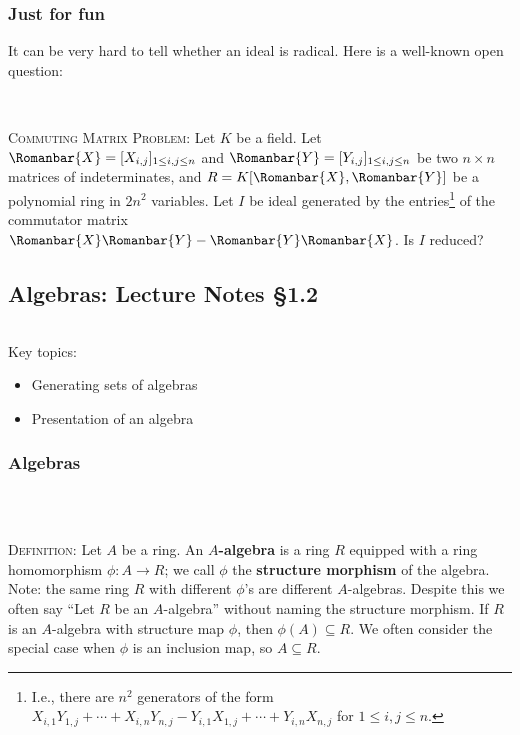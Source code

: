 \documentclass[12pt]{amsart}
\newcommand{\0}{$\phantom{.}$}
\newcommand{\1}{\mathbbm{1}}
\newcommand{\sssec}[1]{\subsubsection*{#1}}
\begin{document}
\subsubsection*{Just for fun} It can be very hard to tell whether an ideal is radical. Here is a well-known open question: 

\

\noindent \textsc{Commuting Matrix Problem:} Let $K$ be a field. Let $\Romanbar{X}=[X_{i,j}]_{1\leq i,j \leq n}$ and $\Romanbar{Y}=[Y_{i,j}]_{1\leq i,j \leq n}$ be two $n\times n$ matrices of indeterminates, and $R=K[\Romanbar{X},\Romanbar{Y}]$ be a polynomial ring in $2n^2$ variables. Let $I$ be ideal generated by the entries\footnote{I.e., there are $n^2$ generators of the form $X_{i,1} Y_{1,j} + \cdots +  X_{i,n} Y_{n,j} - Y_{i,1} X_{1,j} + \cdots +  Y_{i,n} X_{n,j}$ for $1\leq i,j\leq n$.} of the commutator matrix $\Romanbar{X}\Romanbar{Y}-\Romanbar{Y}\Romanbar{X}$. Is $I$ reduced?


\newpage




\subsection{Algebras: Lecture Notes \S1.2} \0



\begin{framed} Key topics:
\begin{itemize}
\item Generating sets of algebras
\item Presentation of an algebra
\end{itemize}
\end{framed}



\sssec{Algebras} \0

\

\noindent \textsc{Definition:} Let $A$ be a ring. An \textbf{$A$-algebra} is a ring $R$ equipped with a ring homomorphism ${\phi:A\to R}$; we call $\phi$ the \textbf{structure morphism} of the algebra. Note: the same ring $R$ with different $\phi$'s are different {$A$-algebras}. Despite this we often say ``Let $R$ be an $A$-algebra'' without naming the structure morphism. If $R$ is an $A$-algebra with structure map $\phi$, then $\phi(A) \subseteq R$. We often consider the special case when $\phi$ is an inclusion map, so $A\subseteq R$.
\end{document}
